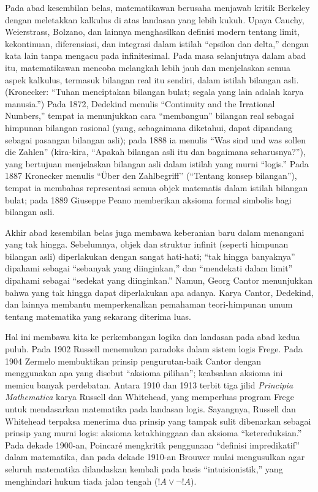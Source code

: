 \documentclass[../../../include/open-logic-section]{subfiles}
\begin{document}
Pada abad kesembilan belas, matematikawan berusaha menjawab kritik Berkeley
dengan meletakkan kalkulus di atas landasan yang lebih kukuh. Upaya Cauchy,
Weierstrass, Bolzano, dan lainnya menghasilkan definisi modern tentang limit,
kekontinuan, diferensiasi, dan integrasi dalam istilah ``epsilon dan delta,''
dengan kata lain tanpa mengacu pada infinitesimal. Pada masa selanjutnya
dalam abad itu, matematikawan mencoba melangkah lebih jauh dan menjelaskan
semua aspek kalkulus, termasuk bilangan real itu sendiri, dalam istilah
bilangan asli. (Kronecker: ``Tuhan menciptakan bilangan bulat; segala yang
lain adalah karya manusia.'') Pada 1872, Dedekind menulis ``Continuity and
the Irrational Numbers,'' tempat ia menunjukkan cara ``membangun'' bilangan
real sebagai himpunan bilangan rasional (yang, sebagaimana diketahui, dapat
dipandang sebagai pasangan bilangan asli); pada 1888 ia menulis ``Was sind
und was sollen die Zahlen'' (kira-kira, ``Apakah bilangan asli itu dan
bagaimana seharusnya?''), yang bertujuan menjelaskan bilangan asli dalam
istilah yang murni ``logis.'' Pada 1887 Kronecker menulis ``\"Uber den
Zahlbegriff'' (``Tentang konsep bilangan''), tempat ia membahas representasi
semua objek matematis dalam istilah bilangan bulat; pada 1889 Giuseppe Peano
memberikan aksioma formal simbolis bagi bilangan asli.

Akhir abad kesembilan belas juga membawa keberanian baru dalam menangani yang
tak hingga. Sebelumnya, objek dan struktur infinit (seperti himpunan bilangan
asli) diperlakukan dengan sangat hati-hati; ``tak hingga banyaknya'' dipahami
sebagai ``sebanyak yang diinginkan,'' dan ``mendekati dalam limit'' dipahami
sebagai ``sedekat yang diinginkan.'' Namun, Georg Cantor menunjukkan bahwa
yang tak hingga dapat diperlakukan apa adanya. Karya Cantor, Dedekind, dan
lainnya membantu memperkenalkan pemahaman teori-himpunan umum tentang
matematika yang sekarang diterima luas.

Hal ini membawa kita ke perkembangan logika dan landasan pada abad kedua
puluh. Pada 1902 Russell menemukan paradoks dalam sistem logis Frege. Pada
1904 Zermelo membuktikan prinsip pengurutan-baik Cantor dengan menggunakan
apa yang disebut ``aksioma pilihan''; keabsahan aksioma ini memicu banyak
perdebatan. Antara 1910 dan 1913 terbit tiga jilid \emph{Principia
Mathematica} karya Russell dan Whitehead, yang memperluas program Frege untuk
mendasarkan matematika pada landasan logis. Sayangnya, Russell dan Whitehead
terpaksa menerima dua prinsip yang tampak sulit dibenarkan sebagai prinsip
yang murni logis: aksioma ketakhinggaan dan aksioma ``ketereduksian.'' Pada
dekade 1900-an, Poincar\'e mengkritik penggunaan ``definisi impredikatif''
dalam matematika, dan pada dekade 1910-an Brouwer mulai mengusulkan agar
seluruh matematika dilandaskan kembali pada basis ``intuisionistik,'' yang
menghindari hukum tiada jalan tengah ($!A \lor \lnot !A$).
\end{document}
